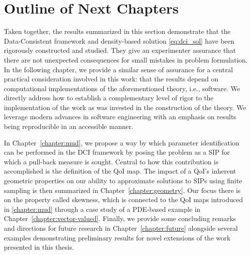 \section{Outline of Next Chapters}\label{sec:outline}
Taken together, the results summarized in this section demonstrate that the Data-Consistent framework and density-based solution \eqref{eq:dci_sol} have been rigorously constructed and studied.
They give an experimenter assurance that there are not unexpected consequences for small mistakes in problem formulation.
In the following chapter, we provide a similar sense of assurance for a central practical consideration involved in this work: that the results depend on computational implementations of the aforementioned theory, i.e., software.
We directly address how to establish a complementary level of rigor to the implementation of the work as was invested in the construction of the theory.
We leverage modern advances in software engineering with an emphasis on results being reproducible in an accessible manner.

In Chapter~\ref{chapter:mud}, we propose a way by which parameter identification can be performed in the DCI framework by posing the problem as a SIP for which a pull-back measure is sought.
Central to how this contribution is accomplished is the definition of the QoI map.
The impact of a QoI's inherent geometric properties on our ability to approximate solutions to SIPs using finite sampling is then summarized in Chapter~\ref{chapter:geometry}.
Our focus there is on the property called skewness, which is connected to the QoI maps introduced in \ref{chapter:mud} through a case study of a PDE-based example in Chapter~\ref{chapter:vector-valued}.
Finally, we provide some concluding remarks and directions for future research in Chapter~\ref{chapter:future} alongside several examples demonstrating preliminary results for novel extensions of the work presented in this thesis.
